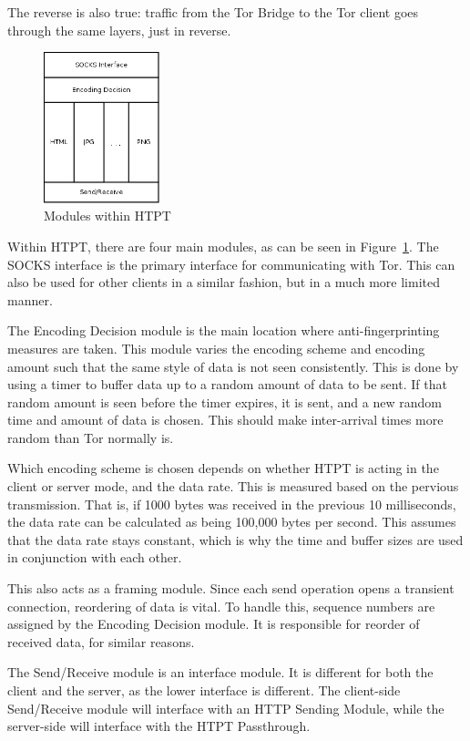 The reverse is also true: traffic from the Tor Bridge to the Tor client goes through the same layers, just in reverse. 

\begin{figure}[b]
\centering
\includegraphics[width=0.3\textwidth]{htpt_architecture}
\caption{Modules within HTPT}
\label{fig:htpt_modules}
\end{figure}

Within HTPT, there are four main modules, as can be seen in Figure~\ref{fig:htpt_modules}. The SOCKS interface is the primary interface for communicating with Tor. This can also be used for other clients in a similar fashion, but in a much more limited manner.

The Encoding Decision module is the main location where anti-fingerprinting measures are taken. This module varies the encoding scheme and encoding amount such that the same style of data is not seen consistently. This is done by using a timer to buffer data up to a random amount of data to be sent. If that random amount is seen before the timer expires, it is sent, and a new random time and amount of data is chosen. This should make inter-arrival times more random than Tor normally is. 

Which encoding scheme is chosen depends on whether HTPT is acting in the client or server mode, and the data rate. This is measured based on the pervious transmission. That is, if 1000 bytes was received in the previous 10 milliseconds, the data rate can be calculated as being 100,000 bytes per second. This assumes that the data rate stays constant, which is why the time and buffer sizes are used in conjunction with each other.

This also acts as a framing module. Since each send operation opens a transient connection, reordering of data is vital. To handle this, sequence numbers are assigned by the Encoding Decision module. It is responsible for reorder of received data, for similar reasons. 

The Send/Receive module is an interface module. It is different for both the client and the server, as the lower interface is different. The client-side Send/Receive module will interface with an HTTP Sending Module, while the server-side will interface with the HTPT Passthrough.

